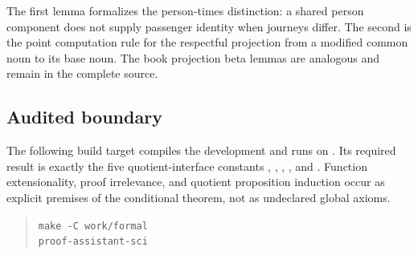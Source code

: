 \documentclass[11pt]{article}
\begin{document}
The first lemma formalizes the person-times distinction: a shared person
component does not supply passenger identity when journeys differ.  The second
is the point computation rule for the respectful projection from a modified
common noun to its base noun.  The book projection beta lemmas are analogous
and remain in the complete source.

\subsection{Audited boundary}

The following build target compiles the development and runs
 on
.  Its required result is exactly
the five quotient-interface constants , ,
, , and .  Function extensionality,
proof irrelevance, and quotient proposition induction occur as explicit
premises of the conditional theorem, not as undeclared global axioms.
\begin{quote}
\small\texttt{make -C work/formal}\\
\texttt{proof-assistant-sci}
\end{quote}
\end{document}
